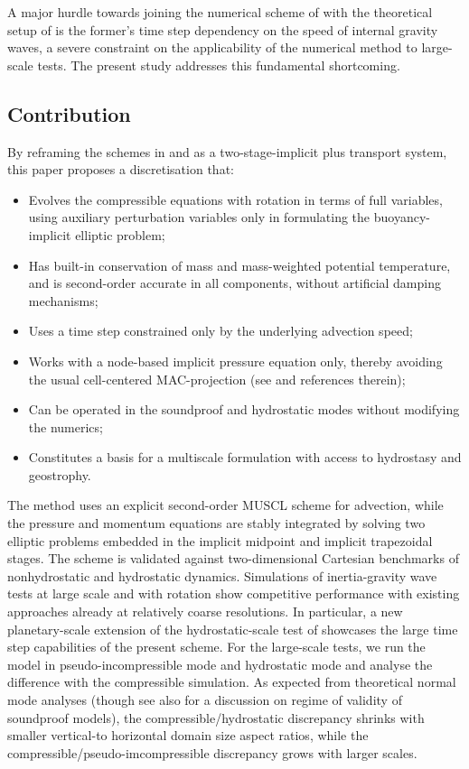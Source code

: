 \documentclass[12pt,a4paper]{article}
\theoremstyle{definition}
\begin{document}
A major hurdle towards joining the numerical scheme of \cite{BenacchioEtAl2014} with the theoretical setup of \cite{KleinBenacchio2016} is the former's time step dependency on the speed of internal gravity waves, a severe constraint on the applicability of the numerical method to large-scale tests. The present study addresses this fundamental shortcoming. 

\subsection{Contribution}

By reframing the schemes in \cite{KleinTCFD2009} and \cite{BenacchioEtAl2014} as a two-stage-implicit plus transport system, this paper proposes a discretisation that:
%
\begin{itemize}
\item Evolves the compressible equations with rotation in terms of full variables, using auxiliary perturbation variables only in formulating the buoyancy-implicit elliptic problem;
\item Has built-in conservation of mass and mass-weighted potential temperature, and is second-order accurate in all components, without artificial damping mechanisms;
\item Uses a time step constrained only by the underlying advection speed;
\item Works with a node-based implicit pressure equation only, thereby avoiding the usual cell-centered MAC-projection (see \cite{AlmgrenEtAl1998} and references therein); 
\item Can be operated in the soundproof and hydrostatic modes without modifying the numerics;
\item Constitutes a basis for a multiscale formulation with access to hydrostasy and geostrophy.
\end{itemize}

The method uses an explicit second-order MUSCL scheme for advection, while the pressure and momentum equations are stably integrated by solving two elliptic problems embedded in the implicit midpoint and implicit trapezoidal stages. The scheme is validated against two-dimensional Cartesian benchmarks of nonhydrostatic and hydrostatic dynamics. Simulations of inertia-gravity wave tests at large scale and with rotation show competitive performance with existing approaches already at relatively coarse resolutions. In particular, a new planetary-scale extension of the hydrostatic-scale test of \cite{SkamarockKlemp1994} showcases the large time step capabilities of the present scheme. For the large-scale tests, we run the model in pseudo-incompressible mode and hydrostatic mode and analyse the difference with the compressible simulation. As expected from theoretical normal mode analyses \cite{DaviesEtAl2003, Dukowicz2013} (though see also \cite{KleinEtAl2010} for a discussion on regime of validity of soundproof models), the compressible/hydrostatic discrepancy shrinks with smaller vertical-to horizontal domain size aspect ratios, while the compressible/pseudo-imcompressible discrepancy grows with larger scales.
\end{document}
